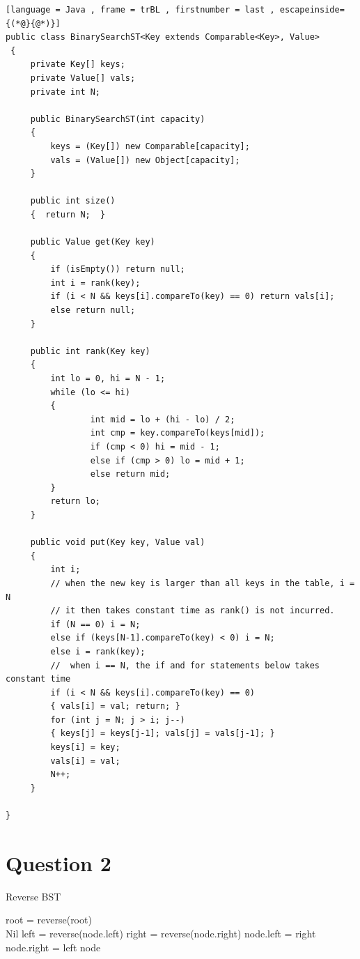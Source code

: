 \documentclass[11pt]{article}
\begin{document}
\begin{lstlisting}[language = Java , frame = trBL , firstnumber = last , escapeinside={(*@}{@*)}]
public class BinarySearchST<Key extends Comparable<Key>, Value>
 {  
     private Key[] keys;
     private Value[] vals;
     private int N;
     
     public BinarySearchST(int capacity)
     { 
         keys = (Key[]) new Comparable[capacity];
         vals = (Value[]) new Object[capacity];
     }
     
     public int size()
     {  return N;  }
     
     public Value get(Key key)
     {
         if (isEmpty()) return null;
         int i = rank(key);
         if (i < N && keys[i].compareTo(key) == 0) return vals[i]; 
         else return null;
     }
     
     public int rank(Key key)
     {
         int lo = 0, hi = N - 1;
         while (lo <= hi)
         {
                 int mid = lo + (hi - lo) / 2;
                 int cmp = key.compareTo(keys[mid]);
                 if (cmp < 0) hi = mid - 1;
                 else if (cmp > 0) lo = mid + 1;
                 else return mid;
         } 
         return lo;
     }
     
     public void put(Key key, Value val)
     {   
         int i;
         // when the new key is larger than all keys in the table, i = N
         // it then takes constant time as rank() is not incurred.
         if (N == 0) i = N;
         else if (keys[N-1].compareTo(key) < 0) i = N;
         else i = rank(key);
         //  when i == N, the if and for statements below takes constant time
         if (i < N && keys[i].compareTo(key) == 0)
         { vals[i] = val; return; }
         for (int j = N; j > i; j--)
         { keys[j] = keys[j-1]; vals[j] = vals[j-1]; } 
         keys[i] = key; 
         vals[i] = val;
         N++;
     }
     
}
\end{lstlisting}

\section{Question 2}
\begin{algorithm}
\caption{Reverse BST}
\begin{algorithmic}[1]
	\State root = reverse(root)
\\
\EndProcedure
{}
		\State \Return Nil
	\EndIf
	\State left = reverse(node.left)
	\State right = reverse(node.right)
	\State node.left = right
	\State node.right = left
	\State \Return node
\EndProcedure
\end{algorithmic}
\end{algorithm}
\end{document}

